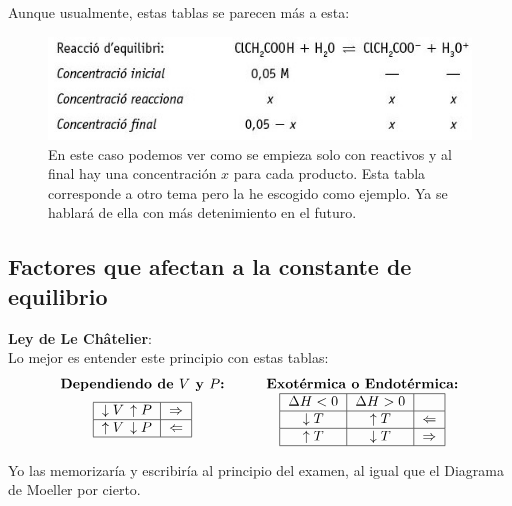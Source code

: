 \documentclass[arial,a4paper,print]{article}
\begin{document}
Aunque usualmente, estas tablas se parecen más a esta:
\begin{figure}[H]
	\centering
	\includegraphics[width=0.7\linewidth]{figures/tabla2_Kc}
	\caption{En este caso podemos ver como se empieza solo con reactivos y al final hay una concentración $x$ para cada producto. Esta tabla corresponde a otro tema pero la he escogido como ejemplo. Ya se hablará de ella con más detenimiento en el futuro. }
	\label{fig:tabla2kc}
\end{figure}

\subsection{Factores que afectan a la constante de equilibrio}

\textbf{Ley de Le Châtelier}: \\
Lo mejor es entender este principio con estas tablas: \\


\begin{equation*}
	\begin{array}{cc}
		\textbf{Dependiendo de $V$ y $P$:} \qquad &	\textbf{Exotérmica o Endotérmica:} \\	
		
		
	\begin{tabular}{|c|c|}
		\hline
		$\downarrow V\, \uparrow P$  & $\Rightarrow$ \\
		\hline
		$\uparrow V\, \downarrow P$ & $\Leftarrow$ \\
		\hline
	\end{tabular}

	\qquad &
	
	\begin{tabular}{|c|c|c|} 
		\hline
		$\Delta H <0$ & $\Delta H > 0$  &  \\
		\hline
		$\downarrow T$  & $\uparrow T$ & $\Leftarrow$ \\
		\hline
		$\uparrow T$ & $\downarrow T$ & $\Rightarrow$ \\
		\hline
	\end{tabular}
\end{array}
\end{equation*}

Yo las memorizaría y escribiría al principio del examen, al igual que el Diagrama de Moeller por cierto. 
\end{document}

